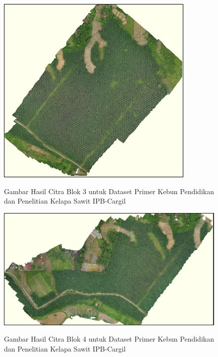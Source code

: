 \begin{figure}[H]
	\vspace{-0.1cm}
	\begin{center}
		\includegraphics[width=0.7\columnwidth]{lampiran/Picture4.png}
	\end{center}
	\vspace{-0.2cm}
	\captionsetup{justification=centering}
	Gambar Hasil Citra Blok 3 untuk Dataset Primer Kebun Pendidikan dan Penelitian Kelapa Sawit IPB-Cargil
\end{figure}

\begin{figure}[H]
	\vspace{-0.1cm}
	\begin{center}
		\includegraphics[width=0.9\columnwidth]{lampiran/Picture5.png}
	\end{center}
	\vspace{-0.2cm}
	\captionsetup{justification=centering}
	Gambar Hasil Citra Blok 4 untuk Dataset Primer Kebun Pendidikan dan Penelitian Kelapa Sawit IPB-Cargil
\end{figure}


